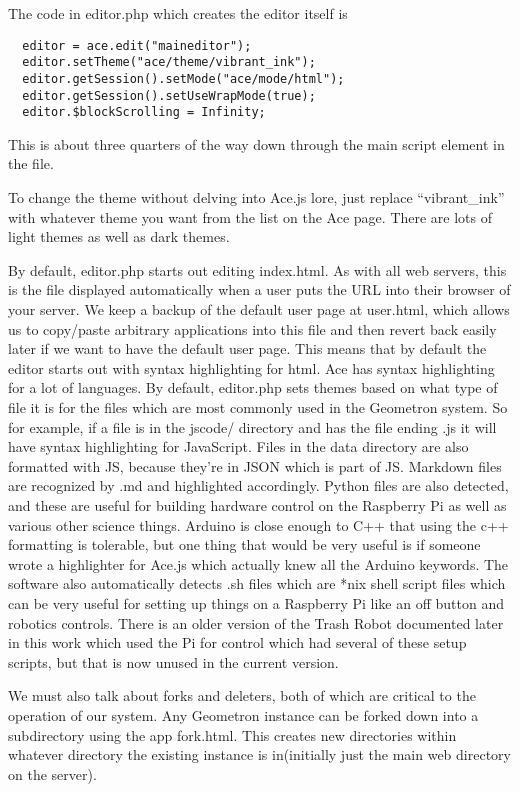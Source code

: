 The code in editor.php which creates the editor itself is 

\begin{verbatim}
  editor = ace.edit("maineditor");
  editor.setTheme("ace/theme/vibrant_ink");
  editor.getSession().setMode("ace/mode/html");
  editor.getSession().setUseWrapMode(true);
  editor.$blockScrolling = Infinity;
\end{verbatim}

This is about three quarters of the way down through the main script element in the file. 

To change the theme without delving into Ace.js lore, just replace ``vibrant_ink'' with whatever theme you want from the list on the Ace page. There are lots of light themes as well as dark themes. 

By default, editor.php starts out editing index.html.  As with all web servers, this is the file displayed automatically when a user puts the URL into their browser of your server.  We keep a backup of the default user page at user.html, which allows us to copy/paste arbitrary applications into this file and then revert back easily later if we want to have the default user page.  This means that by default the editor starts out with syntax highlighting for html.  Ace has syntax highlighting for a lot of languages.  By default, editor.php sets themes based on what type of file it is for the files which are most commonly used in the Geometron system.  So for example, if a file is in the jscode/ directory and has the file ending .js it will have syntax highlighting for JavaScript.  Files in the data directory are also formatted with JS, because they're in JSON which is part of JS.  Markdown files are recognized by .md and highlighted accordingly.  Python files are also detected, and these are useful for building hardware control on the Raspberry Pi as well as various other science things.  Arduino is close enough to C++ that using the c++ formatting is tolerable, but one thing that would be very useful is if someone wrote a highlighter for Ace.js which actually knew all the Arduino keywords. The software also automatically detects .sh files which are *nix shell script files which can be very useful for setting up things on a Raspberry Pi like an off button and robotics controls.  There is an older version of the Trash Robot documented later in this work which used the Pi for control which had several of these setup scripts, but that is now unused in the current version.

We must also talk about forks and deleters, both of which are critical to the operation of our system.  Any Geometron instance can be forked down into a subdirectory using the app fork.html.  This creates new directories within whatever directory the existing instance is in(initially just the main web directory on the server).

